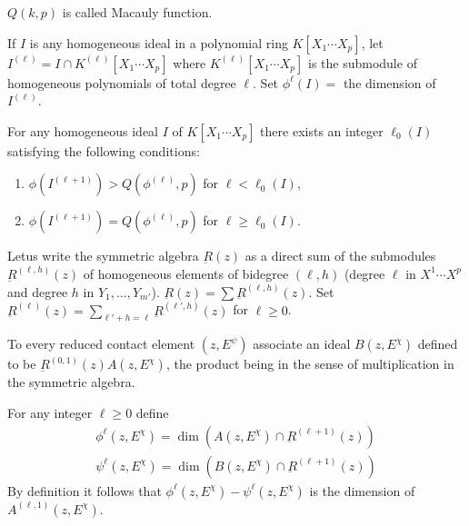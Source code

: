\begin{defi*}
  $Q(k, p)$ is called Macauly function.
\end{defi*}

If $I$ is any homogeneous ideal in a polynomial ring $K[X_1 \cdots
  X_p]$, let $I^{(\ell)} = I \cap K^{(\ell)}[X_1 \cdots X_p]$ where
$K^{(\ell)}[X_1 \cdots X_p]$ is the submodule of homogeneous
polynomials of total degree $\ell$. Set $\phi ^{\ell} (I) = $ the
dimension of $I^{(\ell)}$. 

\begin{theorem}[Hilbert]\label{chap3:sec3.10:thm2}%
  For any homogeneous ideal $I$ of $K[X_1 \cdots X_p]$
  there  exists an integer $\ell_0 (I)$ satisfying the following
  conditions: 
  \begin{enumerate}[\rm (i)]
  \item $\phi (I^{(\ell +1)}) > Q(\phi ^{(\ell)}, p)$ for $\ell < \ell_0 (I)$,
  \item $\phi (I^{(\ell +1)}) = Q(\phi ^{(\ell)}, p)$ for $\ell \geq
    \ell _0 (I)$. 
  \end{enumerate} 
\end{theorem}

Let\pageoriginale us write the symmetric algebra $\underbar{R}(z)$ as a direct sum
of the submodules $\underbar{R}^{(\ell, h)}(z)$ of homogeneous
elements of bidegree $(\ell , h)$ (degree $\ell$ in $X^1 \cdots X^p$
and degree $h$ in $Y_1 , \ldots, Y_{m'}$). $\underbar{R}(z) = \sum
\underbar{R}^{(\ell,h)} (z)$. Set $\underbar{R}^{(\ell)}(z) =
\sum\limits_{\ell' +h= \ell} \underbar{R}^{(\ell' , h)} (z)$ for $\ell
\geq 0$. 

\begin{defi*}
  To every reduced contact  element $(z, E^\psi)$ associate an ideal
  $B(z, E^{\chi})$ defined to be $\underbar{R}^{(0, 1)}(z) A(z,
  E^{\chi})$, the product being in the sense of multiplication in the
  symmetric algebra.  
\end{defi*} 

\begin{defi*}
  For any integer $\ell \geq 0$ define
  \begin{gather*}
    \phi^{\ell} (z, E^{\chi}) = \dim (A(z, E^{\chi}) \cap
    \underbar{R}^{(\ell +1)} (z))\\ 
    \psi^{\ell}(z, E^{\chi}) = \dim (B( z,E^{\chi}) \cap \underbar{R}^{(\ell +1)}(z))
  \end{gather*}
  By definition it follows that $\phi^{\ell} (z, E^\chi) - \psi
  ^{\ell}(z, E^\chi)$ is the dimension of $A^{(\ell ,1)} (z,
  E^{\chi})$. 
\end{defi*}

